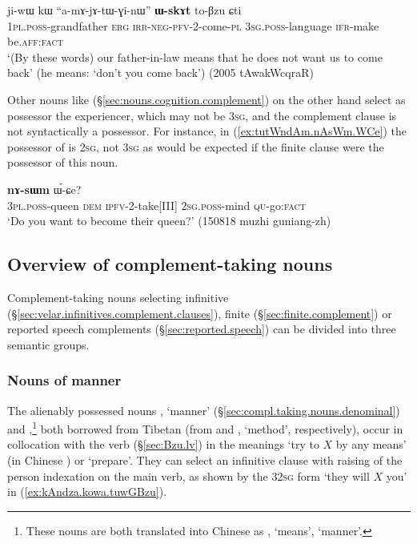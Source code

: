 \begin{exe}
\ex \label{ex:amAjAtWGinW.WskAt}
\gll ji-wɯ kɯ ``a-mɤ-jɤ-tɯ-ɣi-nɯ'' \textbf{ɯ-skɤt} to-βzu ɕti \\
\textsc{1pl}.\textsc{poss}-grandfather \textsc{erg} \textsc{irr}-\textsc{neg}-\textsc{pfv}-2-come-\textsc{pl} \textsc{3sg}.\textsc{poss}-language \textsc{ifr}-make be.\textsc{aff}:\textsc{fact} \\
\glt `(By these words) our father-in-law means that he does not want us to come back' (he means: `don't you come back') (2005 tAwakWcqraR)
\end{exe}

Other nouns like  (§\ref{sec:nouns.cognition.complement}) on the other hand select as possessor the experiencer, which may not be \textsc{3sg}, and the complement clause is not syntactically a possessor. For instance, in (\ref{ex:tutWndAm.nAsWm.WCe}) the possessor of  is \textsc{2sg}, not \textsc{3sg} as would be expected if the finite clause  were the possessor of this noun.

 \begin{exe}
\ex \label{ex:tutWndAm.nAsWm.WCe}
 \textbf{nɤ-sɯm} ɯ́-ɕe? \\
\textsc{3pl}.\textsc{poss}-queen \textsc{dem} \textsc{ipfv}-2-take[III] \textsc{2sg}.\textsc{poss}-mind \textsc{qu}-go:\textsc{fact} \\
\glt `Do you want to become their queen?' (150818 muzhi guniang-zh)
\end{exe}

\subsection{Overview of com\-ple\-ment-taking nouns} \label{sec:complement.taking.noun.list}
Complement-taking nouns selecting infinitive (§\ref{sec:velar.infinitives.complement.clauses}), finite (§\ref{sec:finite.complement}) or reported speech complements (§\ref{sec:reported.speech}) can be divided into three semantic groups.

\subsubsection{Nouns of manner} \label{sec:nouns.manner.complement}
The alienably possessed nouns  , `manner' (§\ref{sec:compl.taking.nouns.denominal}) and ,\footnote{These nouns are both translated into Chinese as , `means', `manner'.} both borrowed from Tibetan (from  and , `method', respectively), occur in collocation with the verb  (§\ref{sec:Bzu.lv}) in the meanings `try to $X$ by any means' (in Chinese ) or `prepare'. They can select an infinitive clause with raising of the person indexation on the main verb, as shown by the 3\fl{}\textsc{2sg} form  `they will $X$ you' in (\ref{ex:kAndza.kowa.tuwGBzu}). 
   

